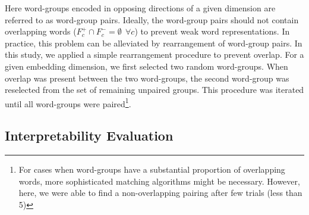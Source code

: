 \documentclass[11pt,a4paper]{article}
\begin{document}
Here word-groups encoded in opposing directions of a given dimension are referred to as word-group pairs. Ideally, the word-group pairs should not contain overlapping words  ($F^+_c \cap F^-_c = \emptyset ~~\forall c$) to prevent weak word representations. In practice, this problem can be alleviated by rearrangement of word-group pairs. In this study, we applied a simple rearrangement procedure to prevent overlap. For a given embedding dimension, we first selected two random word-groups. When overlap was present between the two word-groups, the second word-group was reselected from the set of remaining unpaired groups. This procedure was iterated until all word-groups were paired\footnote{For cases when word-groups have a substantial proportion of overlapping words, more sophisticated matching algorithms might be necessary. However, here, we were able to find a non-overlapping pairing after few trials (less than 5)}.

\subsection{Interpretability Evaluation}
\label{sec:interp_eval}

\end{document}
